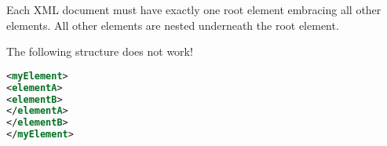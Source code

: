 Each XML document must have exactly one root element embracing all other elements. All other elements are nested underneath the root element.

The following structure does not work!

\begin{lstlisting}[language=XML]
<myElement>
<elementA>
<elementB>
</elementA>
</elementB>
</myElement>
\end{lstlisting}